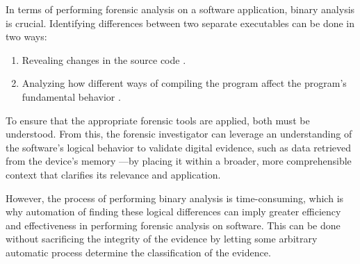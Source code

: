 In terms of performing forensic analysis on a software application, binary analysis is crucial. Identifying differences between two separate
executables can be done in two ways: 

\begin{enumerate}
    \item Revealing changes in the source code \cite{practical_binary_analysis_static_code}.

    \item Analyzing how different ways of compiling the program affect the program's fundamental behavior \cite{practical_binary_analysis_static_code}.
\end{enumerate}

\noindent
To ensure that the appropriate forensic tools are applied, both must be understood.
From this, the forensic investigator can leverage an understanding of the software's 
logical behavior to validate digital evidence, such as data retrieved from the 
device's memory \cite{nij_digital_multimedia_evidence}—by placing it within a 
broader, more comprehensible context that clarifies its relevance and application.

However, the process of performing binary analysis is time-consuming, which is why automation of finding these logical differences can imply greater 
efficiency and effectiveness in performing forensic analysis on software. This can be done without sacrificing the integrity of the evidence by letting some arbitrary automatic process determine the classification of the evidence.

